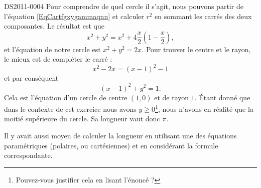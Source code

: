 \begin{corrige}{DS2011-0004}
    Pour comprendre de quel cercle il s'agit, nous pouvons partir de l'équation \eqref{EqCartfgxygammaqnn} et calculer \( r^2\) en sommant les carrés des deux composantes. Le résultat est que
    \begin{equation}
        x^2+y^2=x^2+4\frac{ x }{2}\left( 1-\frac{ x }{2} \right),
    \end{equation}
    et l'équation de notre cercle est \( x^2+y^2=2x\). Pour trouver le centre et le rayon, le mieux est de compléter le carré :
    \begin{equation}
        x^2-2x=(x-1)^2-1
    \end{equation}
    et par conséquent
    \begin{equation}
        (x-1)^2+y^2=1.
    \end{equation}
    Cela est l'équation d'un cercle de centre \( (1,0)\) et de rayon \( 1\). Étant donné que dans le contexte de cet exercice nous avons \( y\geq 0\)\footnote{Pouvez-vous justifier cela en lisant l'énoncé ?}, nous n'avons en réalité que la moitié supérieure du cercle. Sa longueur vaut donc \( \pi\).

    Il y avait aussi moyen de calculer la longueur en utilisant une des équations paramétriques (polaires, ou cartésiennes) et en considérant la formule correspondante.

\end{corrige}
